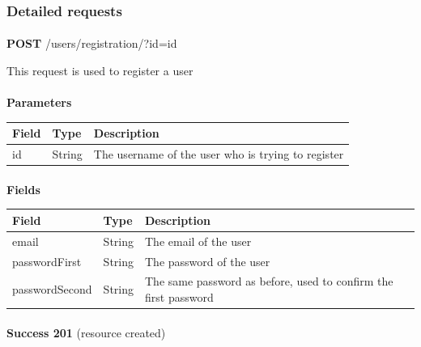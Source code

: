				\subsubsection{Detailed requests}
					\paragraph{}
						\textbf{POST} /users/registration/?id={id}
						
						This request is used to register a user
					\paragraph{}
						\textbf{Parameters}
						\begin{table}[!h]
							\begin{tabular}{L{0.2\textwidth}L{0.2\textwidth}L{0.4\textwidth}}
								\toprule
								Field & Type & Description \\
								\midrule
								 id & String & The username of the user who is trying to register \\
								 \bottomrule
							\end{tabular}
						\end{table}
					\clearpage
					\paragraph{}
						\textbf{Fields}
						\begin{table}[!h]
							\begin{tabular}{L{0.25\textwidth}L{0.15\textwidth}L{0.4\textwidth}}
								\toprule
								Field & Type & Description \\
								\midrule
								 email & String & The email of the user \\
								 passwordFirst & String & The password of the user \\
								 passwordSecond & String & The same password as before, used to confirm the first password \\
								 \bottomrule
							\end{tabular}
						\end{table}
					\paragraph{}
						\textbf{Success 201} (resource created)
